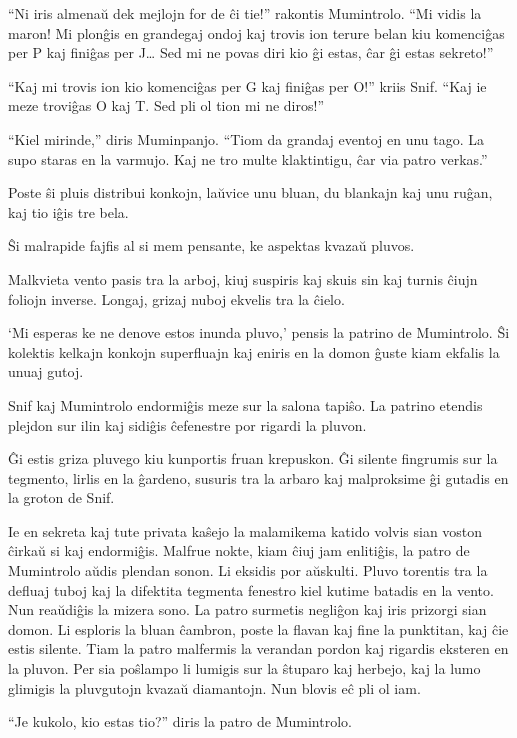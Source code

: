 ``Ni iris almenaŭ dek mejlojn for de ĉi tie!'' rakontis Mumintrolo. ``Mi vidis la maron! Mi plonĝis en grandegaj ondoj kaj trovis ion terure belan kiu komenciĝas per P kaj finiĝas per J{\ldots} Sed mi ne povas diri kio ĝi estas, ĉar ĝi estas sekreto!''

``Kaj mi trovis ion kio komenciĝas per G kaj finiĝas per O!'' kriis Snif. ``Kaj ie meze troviĝas O kaj T. Sed pli ol tion mi ne diros!''

``Kiel mirinde,'' diris Muminpanjo. ``Tiom da grandaj eventoj en unu tago. La supo staras en la varmujo. Kaj ne tro multe klaktintigu, ĉar via patro verkas.''

Poste ŝi pluis distribui konkojn, laŭvice unu bluan, du blankajn kaj unu ruĝan, kaj tio iĝis tre bela.

Ŝi malrapide fajfis al si mem pensante, ke aspektas kvazaŭ pluvos.

Malkvieta vento pasis tra la arboj, kiuj suspiris kaj skuis sin kaj turnis ĉiujn foliojn inverse. Longaj, grizaj nuboj ekvelis tra la ĉielo.

`Mi esperas ke ne denove estos inunda pluvo,' pensis la patrino de Mumintrolo. Ŝi kolektis kelkajn konkojn superfluajn kaj eniris en la domon ĝuste kiam ekfalis la unuaj gutoj.

Snif kaj Mumintrolo endormiĝis meze sur la salona tapiŝo. La patrino etendis plejdon sur ilin kaj sidiĝis ĉefenestre por rigardi la pluvon.

Ĝi estis griza pluvego kiu kunportis fruan krepuskon. Ĝi silente fingrumis sur la tegmento, lirlis en la ĝardeno, susuris tra la arbaro kaj malproksime ĝi gutadis en la groton de Snif.

Ie en sekreta kaj tute privata kaŝejo la malamikema katido volvis sian voston ĉirkaŭ si kaj endormiĝis.
\sectionbreak
Malfrue nokte, kiam ĉiuj jam enlitiĝis, la patro de Mumintrolo aŭdis plendan sonon. Li eksidis por aŭskulti. Pluvo torentis tra la defluaj tuboj kaj la difektita tegmenta fenestro kiel kutime batadis en la vento. Nun reaŭdiĝis la mizera sono. La patro surmetis negliĝon kaj iris prizorgi sian domon. Li esploris la bluan ĉambron, poste la flavan kaj fine la punktitan, kaj ĉie estis silente. Tiam la patro malfermis la verandan pordon kaj rigardis eksteren en la pluvon. Per sia poŝlampo li lumigis sur la ŝtuparo kaj herbejo, kaj la lumo glimigis la pluvgutojn kvazaŭ diamantojn. Nun blovis eĉ pli ol iam.

``Je kukolo, kio estas tio?'' diris la patro de Mumintrolo.

